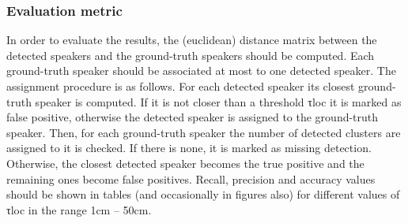 \documentclass[a4paper]{article}
\begin{document}
\subsubsection*{Evaluation metric}
In order to evaluate the results, the (euclidean) distance matrix between the detected speakers and the ground-truth
speakers should be computed. Each ground-truth speaker should be associated at most to one detected speaker. The
assignment procedure is as follows. For each detected speaker its closest ground-truth speaker is computed. If it is not
closer than a threshold τloc it is marked as false positive, otherwise the detected speaker is assigned to the
ground-truth speaker. Then, for each ground-truth speaker the number of detected clusters are assigned to it is checked.
If there is none, it is marked as missing detection. Otherwise, the closest detected speaker becomes the true positive
and the remaining ones become false positives. Recall, precision and accuracy values should be shown in tables (and
occasionally in figures also) for different values of τloc in the range 1cm – 50cm.



\end{document}
